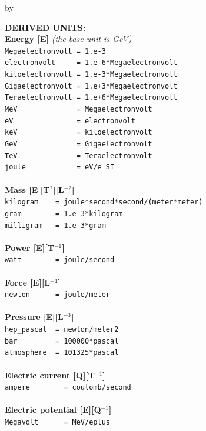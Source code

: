 \documentclass[twoside]{article}
\newcommand{\entrylabel}[1]{\mbox{\textbf{{#1}}}\hfil}%
\newenvironment{entry}
{\begin{list}{}%
    {\renewcommand{\makelabel}{\entrylabel}%
     \setlength{\labelwidth}{90pt}%
     \setlength{\leftmargin}{\labelwidth}
     \advance\leftmargin by \labelsep%
      }%
    }%
  {\end{list}}
\newcommand{\Entrylabel}[1]%
{\raisebox{0pt}[1ex][0pt]{\makebox[\labelwidth][l]%
    {\parbox[t]{\labelwidth}{\hspace{0pt}\textbf{{#1}}}}}}
\newenvironment{Entry}%
{\renewcommand{\entrylabel}{\Entrylabel}\begin{entry}}%
  {\end{entry}}
\begin{document}
\begin{Entry}
{\bf DERIVED UNITS: \\Energy [E]} {\it (the base unit is GeV)}\\
  \verb+Megaelectronvolt = 1.e-3+ \\ 
  \verb+electronvolt     = 1.e-6*Megaelectronvolt+ \\ 
  \verb+kiloelectronvolt = 1.e-3*Megaelectronvolt+ \\ 
  \verb#Gigaelectronvolt = 1.e+3*Megaelectronvolt# \\ 
  \verb#Teraelectronvolt = 1.e+6*Megaelectronvolt# \\ 
  \verb+MeV              = Megaelectronvolt+ \\   
  \verb+eV               = electronvolt+ \\
  \verb+keV              = kiloelectronvolt+ \\
  \verb#GeV              = Gigaelectronvolt# \\  
  \verb#TeV              = Teraelectronvolt# \\
  \verb+joule            = eV/e_SI+ \\ \\
{\bf Mass [E][T$^{2}$][L$^{-2}$]} \\
  \verb+kilogram    = joule*second*second/(meter*meter)+ \\
  \verb+gram        = 1.e-3*kilogram+ \\
  \verb+milligram   = 1.e-3*gram+ \\ \\
{\bf Power [E][T$^{-1}$]} \\
  \verb+watt        = joule/second+ \\ \\
{\bf Force [E][L$^{-1}$]} \\
  \verb+newton      = joule/meter+ \\ \\
{\bf Pressure [E][L$^{-3}$]} \\
  \verb+hep_pascal  = newton/meter2+ \\
  \verb+bar         = 100000*pascal+ \\
  \verb+atmosphere  = 101325*pascal+ \\ \\
{\bf Electric current [Q][T$^{-1}$]} \\
  \verb+ampere        = coulomb/second+ \\ \\
{\bf Electric potential [E][Q$^{-1}$]} \\
  \verb+Megavolt      = MeV/eplus+ \\

\end{Entry}
\end{document}
